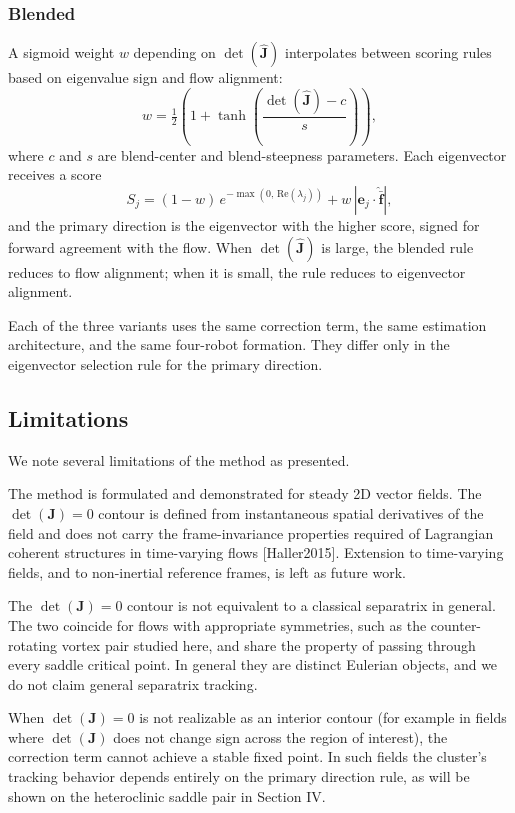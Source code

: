 \documentclass[lettersize,journal]{IEEEtran}
\begin{document}
\subsubsection{Blended}
A sigmoid weight $w$ depending on $\det(\hat{\mathbf{J}})$ interpolates between scoring rules based on eigenvalue sign and flow alignment:
\begin{equation}
w = \tfrac{1}{2}\!\left(1 + \tanh\!\left(\frac{\det(\hat{\mathbf{J}}) - c}{s}\right)\right),
\end{equation}
where $c$ and $s$ are blend-center and blend-steepness parameters. Each eigenvector receives a score
\begin{equation}
S_j = (1 - w)\, e^{-\max(0,\,\mathrm{Re}(\lambda_j))} + w\, \left| \mathbf{e}_j \cdot \hat{\bar{\mathbf{f}}} \right|,
\end{equation}
and the primary direction is the eigenvector with the higher score, signed for forward agreement with the flow. When $\det(\hat{\mathbf{J}})$ is large, the blended rule reduces to flow alignment; when it is small, the rule reduces to eigenvector alignment.

Each of the three variants uses the same correction term, the same estimation architecture, and the same four-robot formation. They differ only in the eigenvector selection rule for the primary direction.


\subsection{Limitations}

We note several limitations of the method as presented.

The method is formulated and demonstrated for steady 2D vector fields. The $\det(\mathbf{J}) = 0$ contour is defined from instantaneous spatial derivatives of the field and does not carry the frame-invariance properties required of Lagrangian coherent structures in time-varying flows [Haller2015]. Extension to time-varying fields, and to non-inertial reference frames, is left as future work.

The $\det(\mathbf{J}) = 0$ contour is not equivalent to a classical separatrix in general. The two coincide for flows with appropriate symmetries, such as the counter-rotating vortex pair studied here, and share the property of passing through every saddle critical point. In general they are distinct Eulerian objects, and we do not claim general separatrix tracking.

When $\det(\mathbf{J}) = 0$ is not realizable as an interior contour (for example in fields where $\det(\mathbf{J})$ does not change sign across the region of interest), the correction term cannot achieve a stable fixed point. In such fields the cluster's tracking behavior depends entirely on the primary direction rule, as will be shown on the heteroclinic saddle pair in Section IV.
\end{document}
